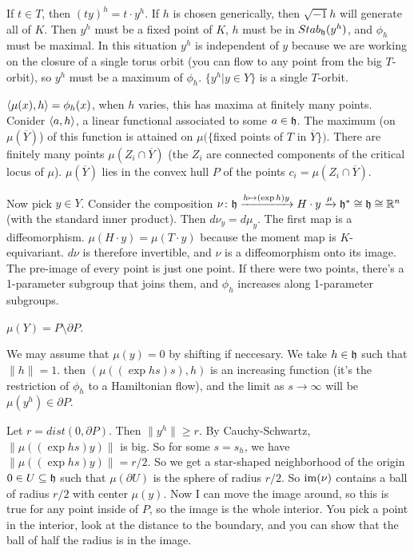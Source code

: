 If $t\in T$, then $(ty)^h=t\cdot y^h$. If $h$ is chosen generically, then $\sqrt{-1}h$ will generate all of $K$. Then $y^h$ must be a fixed point of $K$, $h$ must be in $Stab_{\mathfrak{h}}(y^h)$, and $\phi_h$ must be maximal. In this situation $y^h$ is independent of $y$ because we are working on the closure of a single torus orbit (you can flow to any point from the big $T$-orbit), so $y^h$ must be a maximum of $\phi_h$. $\{y^h|y\in Y\}$ is a single $T$-orbit.

$\langle\mu(x),h\rangle=\phi_h(x)$, when $h$ varies, this has maxima at finitely many points. Conider $\langle a,h\rangle$, a linear functional associated to some $a\in \mathfrak{h}$. The maximum (on $\mu(\overline Y)$) of this function is attained on $\mu(\{$fixed points of $T$ in $\overline Y\})$. There are finitely many points $\mu(Z_i\cap \overline Y)$ (the $Z_i$ are connected components of the critical locus of $\mu$). $\mu(\overline Y)$ lies in the convex hull $P$ of the points $c_i=\mu(Z_i\cap \overline Y)$.

Now pick $y\in Y$. Consider the composition $\nu\colon \mathfrak{h}\xrightarrow{h\mapsto (\exp h)y} H\cdot y\xrightarrow\mu \mathfrak{h}^*\cong\mathfrak{h}\cong \mathbb{R}^n$ (with the standard inner product). Then $d\nu_y=d\mu_y$. The first map is a diffeomorphism. $\mu(H\cdot y)=\mu(T\cdot y)$ because the moment map is $K$-equivariant. $d\nu$ is therefore invertible, and $\nu$ is a diffeomorphism onto its image. The pre-image of every point is just one point. If there were two points, there's a 1-parameter subgroup that joins them, and $\phi_h$ increases along 1-parameter subgroups.

\begin{claim}
 $\mu(Y)=P\setminus \partial P$.
\end{claim}
We may assume that $\mu(y)=0$ by shifting if neccesary. We take $h\in \mathfrak{h}$ such that $\|h\|=1$. then $(\mu((\exp hs)s),h)$ is an increasing function (it's the restriction of $\phi_h$ to a Hamiltonian flow), and the limit as $s\to\infty$ will be $\mu(y^h)\in \partial P$.

Let $r=dist(0,\partial P)$. Then $\|y^h\|\ge r$. By Cauchy-Schwartz, $\|\mu((\exp hs)y)\|$ is big. So for some $s=s_h$, we have $\|\mu((\exp hs)y)\|=r/2$. So we get a star-shaped neighborhood of the origin $0\in U\subseteq \mathfrak{h}$ such that $\mu(\partial U)$ is the sphere of radius $r/2$. So $\operatorname{im}(\nu)$ contains a ball of radius $r/2$ with center $\mu(y)$. Now I can move the image around, so this is true for any point inside of $P$, so the image is the whole interior. You pick a point in the interior, look at the distance to the boundary, and you can show that the ball of half the radius is in the image.

